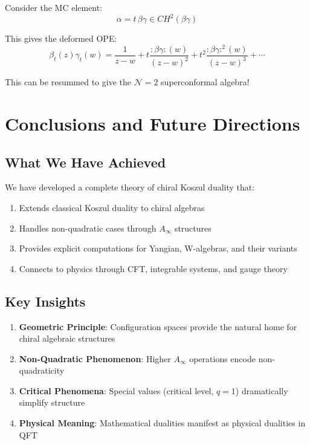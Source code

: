 Consider the MC element:
\[
\alpha = t \, \beta \gamma \in CH^2(\beta\gamma)
\]

This gives the deformed OPE:
\[
\beta_t(z)\gamma_t(w) = \frac{1}{z-w} + t \frac{:\beta\gamma:(w)}{(z-w)^2} + t^2 \frac{:\beta\gamma:^2(w)}{(z-w)^3} + \cdots
\]

This can be resummed to give the $\mathcal{N}=2$ superconformal algebra!


\section{Conclusions and Future Directions}

\subsection{What We Have Achieved}

We have developed a complete theory of chiral Koszul duality that:
\begin{enumerate}
\item Extends classical Koszul duality to chiral algebras
\item Handles non-quadratic cases through $A_\infty$ structures
\item Provides explicit computations for Yangian, W-algebras, and their variants
\item Connects to physics through CFT, integrable systems, and gauge theory
\end{enumerate}

\subsection{Key Insights}

\begin{enumerate}
\item \textbf{Geometric Principle}: Configuration spaces provide the natural home for chiral algebraic structures
\item \textbf{Non-Quadratic Phenomenon}: Higher $A_\infty$ operations encode non-quadraticity
\item \textbf{Critical Phenomena}: Special values (critical level, $q=1$) dramatically simplify structure
\item \textbf{Physical Meaning}: Mathematical dualities manifest as physical dualities in QFT
\end{enumerate}

